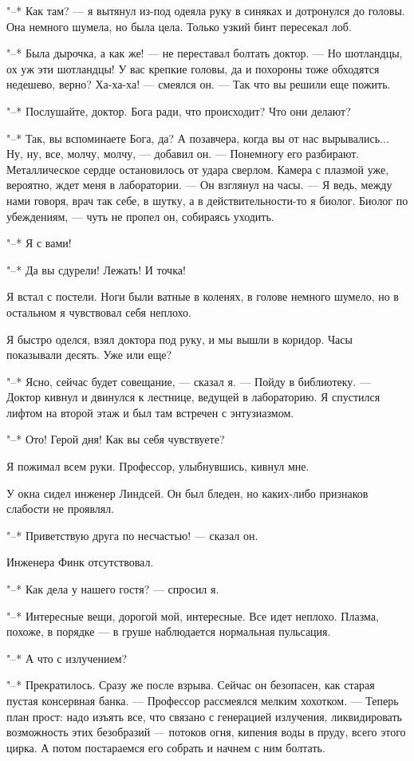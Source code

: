 "--* Как там? --- я вытянул из-под одеяла руку в  синяках  и  дотронулся  до
головы. Она немного шумела, но была цела. Только узкий бинт пересекал лоб.

"--* Была дырочка, а  как  же!  ---  не  переставал  болтать  доктор.  ---  Но
шотландцы, ох уж эти шотландцы! У вас крепкие головы, да и  похороны  тоже
обходятся недешево, верно? Ха-ха-ха! --- смеялся он. --- Так что вы решили еще
пожить.

"--* Послушайте, доктор. Бога ради, что происходит? Что они делают?

"--*  Так,  вы  вспоминаете  Бога,  да?  А  позавчера,  когда  вы  от  нас
вырывались... Ну, ну, все, молчу, молчу, --- добавил  он.  ---  Понемногу  его
разбирают. Металлическое сердце остановилось от удара  сверлом.  Камера  с
плазмой уже, вероятно, ждет меня в лаборатории. --- Он взглянул на часы. --- Я
ведь, между нами говоря, врач так себе, в шутку, а в действительности-то я
биолог. Биолог по убеждениям, --- чуть не пропел он, собираясь уходить.

"--* Я с вами!

"--* Да вы сдурели! Лежать! И точка!

Я встал с постели. Ноги были ватные в коленях, в голове немного шумело,
но в остальном я чувствовал себя неплохо.

Я быстро оделся, взял доктора под руку, и  мы  вышли  в  коридор.  Часы
показывали десять. Уже или еще?

"--* Ясно, сейчас будет совещание, --- сказал я. ---  Пойду  в  библиотеку.  ---
Доктор кивнул и двинулся к лестнице, ведущей в  лабораторию.  Я  спустился
лифтом на второй этаж и был там встречен с энтузиазмом.

"--* Ото! Герой дня! Как вы себя чувствуете?

Я пожимал всем руки. Профессор, улыбнувшись, кивнул мне.

У окна сидел инженер Линдсей. Он был бледен,  но  каких-либо  признаков
слабости не проявлял.

"--* Приветствую друга по несчастью! --- сказал он.

Инженера Финк отсутствовал.

"--* Как дела у нашего гостя? --- спросил я.

"--* Интересные вещи, дорогой мой, интересные. Все идет  неплохо.  Плазма,
похоже, в порядке --- в груше наблюдается нормальная пульсация.

"--* А что с излучением?

"--* Прекратилось. Сразу же после взрыва. Сейчас он безопасен, как  старая
пустая консервная банка. --- Профессор рассмеялся мелким хохотком. ---  Теперь
план  прост:  надо  изъять  все,  что  связано  с  генерацией   излучения,
ликвидировать возможность этих безобразий --- потоков огня, кипения  воды  в
пруду, всего этого цирка. А потом постараемся его собрать и начнем  с  ним
болтать.

